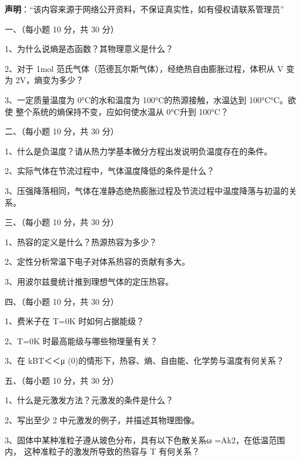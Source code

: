 

\textbf{声明}：“该内容来源于网络公开资料，不保证真实性，如有侵权请联系管理员”



一、（每小题 10 分，共 30 分）

1、为什么说熵是态函数？其物理意义是什么？

2、对于 1mol 范氏气体（范德瓦尔斯气体），经绝热自由膨胀过程，体积从 V 变为
2V，熵变为多少？

3、一定质量温度为 0°C的水和温度为 100°C的热源接触，水温达到 100°C°C。欲使
整个系统的熵保持不变，应如何使水温从 0°C升到 100°C？

二、（每小题 10 分，共 30 分）

1、什么是负温度？请从热力学基本微分方程出发说明负温度存在的条件。

2、实际气体在节流过程中，气体温度降低的条件是什么？

3、压强降落相同，气体在准静态绝热膨胀过程及节流过程中温度降落与初温的关系。

三、（每小题 10 分，共 30 分）

1、热容的定义是什么？热源热容为多少？

2、定性分析常温下电子对体系热容的贡献有多大。

3、用波尔兹曼统计推到理想气体的定压热容。

四、（每小题 10 分，共 30 分）

1、费米子在 T=0K 时如何占据能级？

2、T=0K 时最高能级与哪些物理量有关？

3、在 kBT＜＜μ (0)的情形下，热容、熵、自由能、化学势与温度有何关系？

五、（每小题 10 分，共 30 分）

1、什么是元激发方法？元激发的条件是什么？

2、写出至少 2 中元激发的例子，并描述其物理图像。

3、固体中某种准粒子遵从玻色分布，具有以下色散关系ω =Ak2，在低温范围内，
这种准粒子的激发所导致的热容与 T 有何关系？